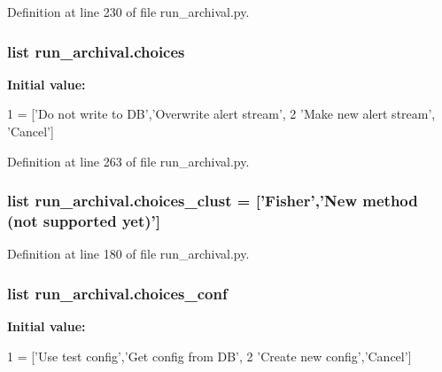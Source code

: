 Definition at line 230 of file run\-\_\-archival.\-py.

\hypertarget{namespacerun__archival_a21a8dd8c60178165d7db340928c7db9b}{
\subsubsection[{choices}]{\setlength{\rightskip}{0pt plus 5cm}list run\-\_\-archival.\-choices}}\label{namespacerun__archival_a21a8dd8c60178165d7db340928c7db9b}
{\bfseries Initial value\-:}
\begin{DoxyCode}
1 = [\textcolor{stringliteral}{'Do not write to DB'},\textcolor{stringliteral}{'Overwrite alert stream'},
2            \textcolor{stringliteral}{'Make new alert stream'}, \textcolor{stringliteral}{'Cancel'}]
\end{DoxyCode}


Definition at line 263 of file run\-\_\-archival.\-py.

\hypertarget{namespacerun__archival_a1aba0598698cad93478f99a531838ef4}{
\subsubsection[{choices\-\_\-clust}]{\setlength{\rightskip}{0pt plus 5cm}list run\-\_\-archival.\-choices\-\_\-clust = \mbox{[}'Fisher','New method (not supported yet)'\mbox{]}}}\label{namespacerun__archival_a1aba0598698cad93478f99a531838ef4}


Definition at line 180 of file run\-\_\-archival.\-py.

\hypertarget{namespacerun__archival_aa8dcfb9c105b84ffc8ceb3c2cb4e6e4a}{
\subsubsection[{choices\-\_\-conf}]{\setlength{\rightskip}{0pt plus 5cm}list run\-\_\-archival.\-choices\-\_\-conf}}\label{namespacerun__archival_aa8dcfb9c105b84ffc8ceb3c2cb4e6e4a}
{\bfseries Initial value\-:}
\begin{DoxyCode}
1 = [\textcolor{stringliteral}{'Use test config'},\textcolor{stringliteral}{'Get config from DB'},
2               \textcolor{stringliteral}{'Create new config'},\textcolor{stringliteral}{'Cancel'}]
\end{DoxyCode}


